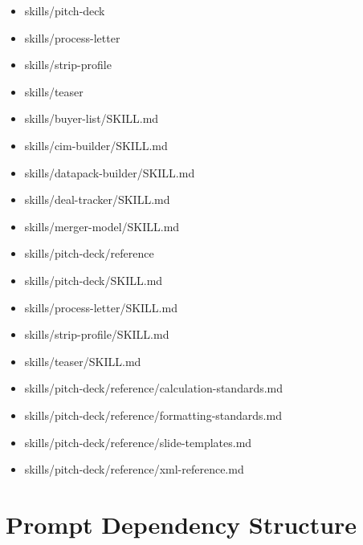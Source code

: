 \documentclass[11pt]{article}
\begin{document}
\begin{itemize}[leftmargin=*,itemsep=1pt,topsep=2pt]
\item \hspace*{0.9em}skills/pitch-deck
\item \hspace*{0.9em}skills/process-letter
\item \hspace*{0.9em}skills/strip-profile
\item \hspace*{0.9em}skills/teaser
\item \hspace*{1.8em}skills/buyer-list/SKILL.md
\item \hspace*{1.8em}skills/cim-builder/SKILL.md
\item \hspace*{1.8em}skills/datapack-builder/SKILL.md
\item \hspace*{1.8em}skills/deal-tracker/SKILL.md
\item \hspace*{1.8em}skills/merger-model/SKILL.md
\item \hspace*{1.8em}skills/pitch-deck/reference
\item \hspace*{1.8em}skills/pitch-deck/SKILL.md
\item \hspace*{1.8em}skills/process-letter/SKILL.md
\item \hspace*{1.8em}skills/strip-profile/SKILL.md
\item \hspace*{1.8em}skills/teaser/SKILL.md
\item \hspace*{2.7em}skills/pitch-deck/reference/calculation-standards.md
\item \hspace*{2.7em}skills/pitch-deck/reference/formatting-standards.md
\item \hspace*{2.7em}skills/pitch-deck/reference/slide-templates.md
\item \hspace*{2.7em}skills/pitch-deck/reference/xml-reference.md
\end{itemize}

\section{Prompt Dependency Structure}
\end{document}
